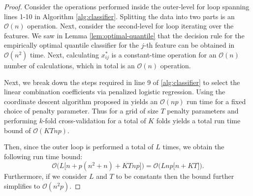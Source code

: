 \begin{proof}
  Consider the operations performed inside the outer-level for loop spanning
  lines 1-10 in Algorithm \ref{alg:classifier}.  Splitting the data into two
  parts is an $\mathcal{O}(n)$ operation.  Next, consider the second-level for
  loop iterating over the features.  We saw in Lemma \ref{lem:optimal-quantile}
  that the decision rule for the empirically optimal quantile classifier for the
  $j$-th feature can be obtained in $\mathcal{O}(n^2)$ time.  Next, calculating
  $x_{ij}^{*}$ is a constant-time operation for an $\mathcal{O}(n)$ number of
  calculations, which in total is an $\mathcal{O}(n)$ operation.

  Next, we break down the steps required in line 9 of \ref{alg:classifier} to
  select the linear combination coefficients via penalized logistic regression.
  Using the coordinate descent algorithm proposed in \cite{friedman2007,
    friedman2010} yields an $\mathcal{O}(np)$ run time for a fixed choice of
  penalty parameter.  Thus for a grid of size $T$ penalty parameters and
  performing $k$-fold cross-validation for a total of $K$ folds yields a total
  run time bound of $\mathcal{O}(KTnp)$.

  Then, since the outer loop is performed a total of $L$ times, we obtain the
  following run time bound:
  \begin{equation}
    \label{eq:classifier-runtime}
    \mathcal{O}\Big( L \Big[ n + p(n^2 + n) + KTnp \Big] \Big)
    = \mathcal{O}\Big( Lnp \Big[ n + KT \Big] \Big).
  \end{equation}
  Furthermore, if we consider $L$ and $T$ to be constants then the bound further
  simplifies to $\mathcal{O}(n^2 p)$.
\end{proof}

